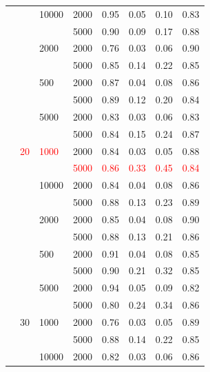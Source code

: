\documentclass[a4paper,10pt]{article}
\begin{document}
\begin{table}[!ht]
\begin{footnotesize}
\begin{tabular}{llllrrrr}
     &    & 10000 & 2000 &       0.95 &       0.05 &       0.10 &       0.83 \\
     &    &      & 5000 &       0.90 &       0.09 &       0.17 &       0.88 \\
     &    & 2000 & 2000 &       0.76 &       0.03 &       0.06 &       0.90 \\
     &    &      & 5000 &       0.85 &       0.14 &       0.22 &       0.85 \\
     &    & 500 & 2000 &       0.87 &       0.04 &       0.08 &       0.86 \\
     &    &      & 5000 &       0.89 &       0.12 &       0.20 &       0.84 \\
     &    & 5000 & 2000 &       0.83 &       0.03 &       0.06 &       0.83 \\
     &    &      & 5000 &       0.84 &       0.15 &       0.24 &       0.87 \\
     & \textcolor{red}{20} & \textcolor{red}{1000} & 2000 &       0.84 &       0.03 &       0.05 &       0.88 \\
     &    &      & \textcolor{red}{5000} &       \textcolor{red}{0.86} &       \textcolor{red}{0.33} &       \textcolor{red}{0.45} &       \textcolor{red}{0.84} \\
     &    & 10000 & 2000 &       0.84 &       0.04 &       0.08 &       0.86 \\
     &    &      & 5000 &       0.88 &       0.13 &       0.23 &       0.89 \\
     &    & 2000 & 2000 &       0.85 &       0.04 &       0.08 &       0.90 \\
     &    &      & 5000 &       0.88 &       0.13 &       0.21 &       0.86 \\
     &    & 500 & 2000 &       0.91 &       0.04 &       0.08 &       0.85 \\
     &    &      & 5000 &       0.90 &       0.21 &       0.32 &       0.85 \\
     &    & 5000 & 2000 &       0.94 &       0.05 &       0.09 &       0.82 \\
     &    &      & 5000 &       0.80 &       0.24 &       0.34 &       0.86 \\
     & 30 & 1000 & 2000 &       0.76 &       0.03 &       0.05 &       0.89 \\
     &    &      & 5000 &       0.88 &       0.14 &       0.22 &       0.85 \\
     &    & 10000 & 2000 &       0.82 &       0.03 &       0.06 &       0.86 \\

\end{tabular}
\end{footnotesize}
\end{table}
\end{document}
